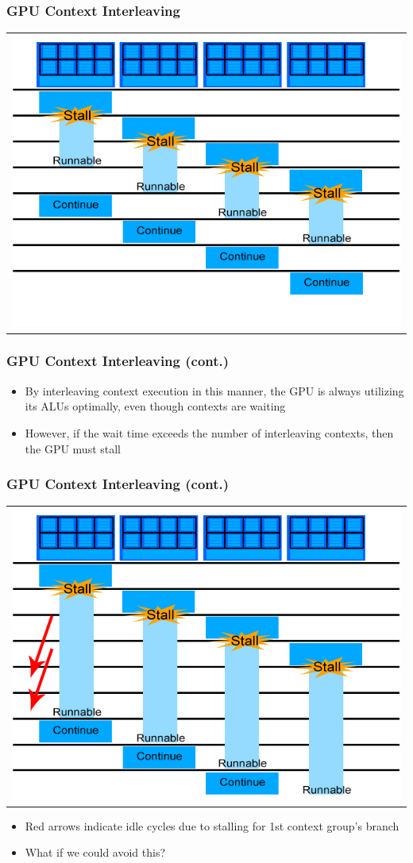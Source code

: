 \documentclass{beamer}
\begin{document}
\begin{frame}
	\frametitle{GPU Context Interleaving}
	\begin{tabular}{c}
		\includegraphics[width=.75\textwidth]{GPU-context-interleaving.jpg}
	\end{tabular}
\end{frame}

\begin{frame}
	\frametitle{GPU Context Interleaving (cont.)}
	\begin{itemize}
		\item By interleaving context execution in this manner, the GPU is always utilizing its ALUs optimally, even though contexts are waiting
		\item However, if the wait time exceeds the number of interleaving contexts, then the GPU must stall
	\end{itemize}
\end{frame}

\begin{frame}
	\frametitle{GPU Context Interleaving (cont.)}
	\begin{tabular}{c}
		\includegraphics[width=.75\textwidth]{GPU-context-interleaving-2.jpg}
	\end{tabular}
	\begin{itemize}
		\item Red arrows indicate idle cycles due to stalling for 1st context group's branch
		\item What if we could avoid this?
	\end{itemize}
\end{frame}
\end{document}
